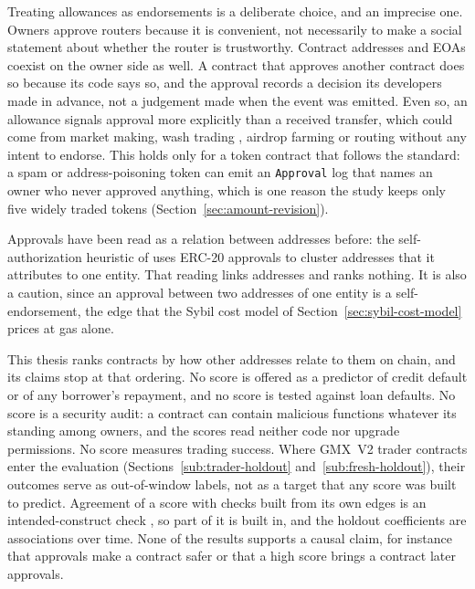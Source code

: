 Treating allowances as endorsements is a deliberate choice, and an imprecise one. Owners approve routers because it is convenient, not necessarily to make a social statement about whether the router is trustworthy. Contract addresses and EOAs coexist on the owner side as well. A contract that approves another contract does so because its code says so, and the approval records a decision its developers made in advance, not a judgement made when the event was emitted. Even so, an allowance signals approval more explicitly than a received transfer, which could come from market making, wash trading \parencite{cong2023washtrading}, airdrop farming \parencite{luo2025airdrop} or routing without any intent to endorse. This holds only for a token contract that follows the standard: a spam or address-poisoning token can emit an \texttt{Approval} log that names an owner who never approved anything, which is one reason the study keeps only five widely traded tokens (Section~\ref{sec:amount-revision}).

Approvals have been read as a relation between addresses before: the self-authorization heuristic of \textcite{victor2020clustering} uses ERC-20 approvals to cluster addresses that it attributes to one entity. That reading links addresses and ranks nothing. It is also a caution, since an approval between two addresses of one entity is a self-endorsement, the edge that the Sybil cost model of Section~\ref{sec:sybil-cost-model} prices at gas alone.


This thesis ranks contracts by how other addresses relate to them on chain, and its claims stop at that ordering. No score is offered as a predictor of credit default or of any borrower's repayment, and no score is tested against loan defaults. No score is a security audit: a contract can contain malicious functions \parencite{lin2024crpwarner} whatever its standing among owners, and the scores read neither code nor upgrade permissions. No score measures trading success. Where GMX~V2 trader contracts enter the evaluation (Sections~\ref{sub:trader-holdout} and~\ref{sub:fresh-holdout}), their outcomes serve as out-of-window labels, not as a target that any score was built to predict. Agreement of a score with checks built from its own edges is an intended-construct check \parencite{cronbach1955construct}, so part of it is built in, and the holdout coefficients are associations over time. None of the results supports a causal claim, for instance that approvals make a contract safer or that a high score brings a contract later approvals.

